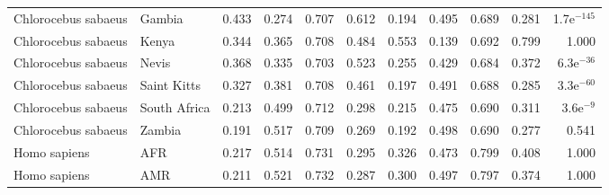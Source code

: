 \begin{center}
\begin{adjustbox}{width = 1\textwidth}
\begin{tabular}{llrrrrrrrrr}
 Chlorocebus sabaeus &                    Gambia &                              0.433 &                               0.274 &                 0.707 &                 0.612 &                              0.194 &                               0.495 &                 0.689 &                 0.281 & 1.7e$^{-145}$ \\
 Chlorocebus sabaeus &                     Kenya &                              0.344 &                               0.365 &                 0.708 &                 0.484 &                              0.553 &                               0.139 &                 0.692 &                 0.799 &         1.000 \\
 Chlorocebus sabaeus &                     Nevis &                              0.368 &                               0.335 &                 0.703 &                 0.523 &                              0.255 &                               0.429 &                 0.684 &                 0.372 &  6.3e$^{-36}$ \\
 Chlorocebus sabaeus &               Saint Kitts &                              0.327 &                               0.381 &                 0.708 &                 0.461 &                              0.197 &                               0.491 &                 0.688 &                 0.285 &  3.3e$^{-60}$ \\
 Chlorocebus sabaeus &              South Africa &                              0.213 &                               0.499 &                 0.712 &                 0.298 &                              0.215 &                               0.475 &                 0.690 &                 0.311 &   3.6e$^{-9}$ \\
 Chlorocebus sabaeus &                    Zambia &                              0.191 &                               0.517 &                 0.709 &                 0.269 &                              0.192 &                               0.498 &                 0.690 &                 0.277 &         0.541 \\
        Homo sapiens &                       AFR &                              0.217 &                               0.514 &                 0.731 &                 0.295 &                              0.326 &                               0.473 &                 0.799 &                 0.408 &         1.000 \\
        Homo sapiens &                       AMR &                              0.211 &                               0.521 &                 0.732 &                 0.287 &                              0.300 &                               0.497 &                 0.797 &                 0.374 &         1.000 \\

\end{tabular}
\end{adjustbox}
\end{center}
